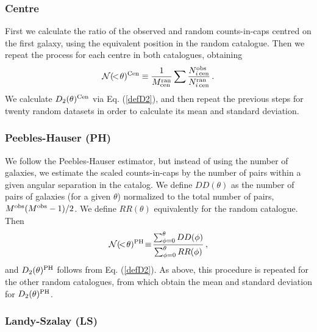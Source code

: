 \documentclass[useAMS,usenatbib]{mn2e}
\begin{document}
\noindent

\subsubsection{Centre}

First we calculate the ratio of the observed and random counts-in-caps centred on the first galaxy, using the equivalent position in the random catalogue. Then we repeat the process for each centre in both catalogues, obtaining
\begin{equation}
\label{Ncenter}
{\cal N}(\!<\!\theta)^{\rm Cen} \equiv 
\frac{1}{M^{\rm ran}_{\rm cen}} \sum \frac{N^{\rm obs}_{i\,{\rm cen}}}{N^{\rm ran}_{i\,{\rm cen}}} \, .
\end{equation}
We calculate $D_2(\theta)^{\rm Cen}$ via Eq. (\ref{defD2}), and then repeat the previous steps for twenty random datasets in order to calculate its mean and standard deviation. \\

\noindent

\subsubsection{Peebles-Hauser (PH)}

We follow the Peebles-Hauser \citep{peebleshauser74} estimator, but instead of using the number of galaxies, we estimate the scaled counts-in-caps by the number of pairs within a given angular separation in the catalog. We define $DD(\theta)$ as the number of pairs of galaxies (for a given $\theta$) normalized to the total number of pairs, $M^{\rm obs}(M^{\rm obs} - 1) / 2$. We define $RR(\theta)$ equivalently for the random catalogue. Then
\begin{equation}
\label{NPH}
{\cal N}(\!<\!\theta)^{{\rm PH}}\! \equiv \!
\frac{\sum^{\theta}_{\phi = 0} DD(\phi)}{\sum^{\theta}_{\phi = 0} RR(\phi)} \, ,
\end{equation}
and $D_2(\theta)^{\rm PH}$ follows from Eq. (\ref{defD2}). As above, this procedure is repeated for the other random catalogues, from which obtain the mean and standard deviation for $D_2(\theta)^{{\rm PH}}$. \\

\noindent

\subsubsection{Landy-Szalay (LS)}
\end{document}
